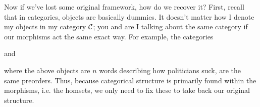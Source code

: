 Now if we've lost some original framework, how do we recover it? First, recall that 
in categories, objects are basically dummies. It doesn't matter how I denote my objects 
in my category $\mathcal{C}$; you and are I talking about the same category if our morphisms 
act the same exact way. For example, the categories 
\begin{center}
\end{center}
and 
\begin{center}
\end{center}
where the above objects are $n$ words describing how politicians suck,
are the same preorders. Thus, because categorical 
structure is primarily found within the morphisms, i.e. the homsets, we only need to 
fix these to take back our original structure. 

